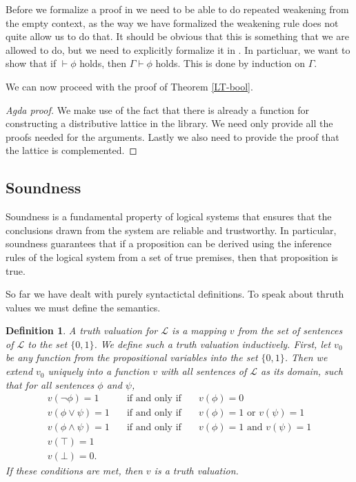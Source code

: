 \documentclass[titlepage]{article}
\newtheorem{definition}{Definition}[section]
\begin{document}
Before we formalize a proof in \Agda we need to be able to do repeated weakening from the empty context, as the way we have formalized the weakening rule does not quite allow us to do that. It should be obvious that this is something that we are allowed to do, but we need to explicitly formalize it in \Agda. In particluar, we want to show that if $\vdash \phi$ holds, then $\Gamma \vdash \phi$ holds. This is done by induction on $\Gamma$.


We can now proceed with the \Agda proof of Theorem \ref{LT-bool}.

\begin{proof}[Agda proof]
    We make use of the fact that there is already a function for constructing a distributive lattice in the \agdaCubical library. We need only provide all the proofs needed for the arguments.
    Lastly we also need to provide the proof that the lattice is complemented.
\end{proof}




\subsection{Soundness}
Soundness is a fundamental property of logical systems that ensures that the conclusions drawn from the system are reliable and trustworthy. In particular, soundness guarantees that if a proposition can be derived using the inference rules of the logical system from a set of true premises, then that proposition is true.

So far we have dealt with purely syntactictal definitions. To speak about thruth values we must define the semantics.

\begin{definition}
    A truth valuation for $\mathcal{L}$ is a mapping $v$ from the set of sentences of $\mathcal{L}$ to the set $\{0,1\}$. We define such a truth valuation inductively. First, let $v_0$ be any function from the propositional variables into the set $\{0,1\}$. Then we extend $v_0$ uniquely into a function $v$ with all sentences of $\mathcal{L}$ as its domain, such that for all sentences $\phi$ and $\psi$,
    \[
    \begin{array}{lcl}
        v(\neg \phi) = 1 &\quad \text{if and only if}& \quad v(\phi) = 0 \\
        v(\phi \vee \psi) = 1 &\quad \text{if and only if} & \quad v(\phi)=1 \text{ or } v(\psi)=1 \\
        v(\phi \wedge \psi) = 1 &\quad \text{if and only if} & \quad  v(\phi) =1 \text{ and } v(\psi)=1 \\
        v(\top) = 1 & &\\
        v(\bot) = 0. & &
    \end{array}
    \]
    If these conditions are met, then $v$ is a truth valuation.
\end{definition}
\end{document}
